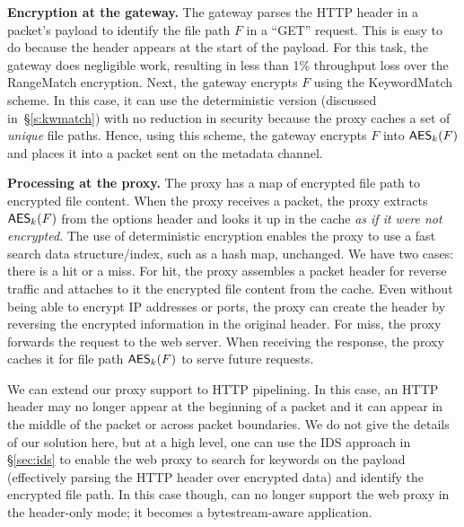 \noindent\textbf{Encryption at the gateway.} 
The gateway parses the HTTP header in a packet's payload to identify the file path $F$ in a ``GET'' request. 
This is easy to do because the header appears at the start of the payload. For this task, the gateway does negligible work, resulting in less than 1\% throughput loss over the RangeMatch encryption. 
Next, the gateway encrypts $F$ using the KeywordMatch scheme. In this case, it can use the deterministic version (discussed in~\S\ref{s:kwmatch}) with no reduction in security because the proxy caches a set of {\em unique} file paths. Hence, using this scheme, the gateway encrypts $F$ into $\mathsf{AES}_k(F)$ and places it into a packet sent on the metadata channel. %

\noindent\textbf{Processing at the proxy.} The proxy has a map of encrypted file path to encrypted file content. When the proxy receives a packet, the proxy extracts $\mathsf{AES}_k(F)$ from the options header and looks it up in the cache {\em as if it were not encrypted}. The use of deterministic encryption enables the proxy to use a fast search data structure/index, such as a hash map, unchanged. We have two cases: there is a hit or a miss. For hit, the proxy assembles a packet header for reverse traffic and attaches to it the encrypted file content from the cache. Even without being able to encrypt IP addresses or ports, the proxy can create the header by reversing the encrypted information in the original header.
For miss, the proxy forwards the request to the web server. When receiving the response, the proxy caches it for file path $\mathsf{AES}_k(F)$ to serve future requests.

We can extend our proxy support to HTTP pipelining. %
In this case,  an HTTP header may no longer appear at the beginning of a packet and it can appear in the middle of the packet or across packet boundaries. We do not give the details of our solution here, but at a high level, one can use the IDS approach in \S\ref{sec:ids} to enable the web proxy to search for keywords on the payload  (effectively parsing the HTTP header over encrypted data) and identify the encrypted file path. In this case though, \sys can no longer support the web proxy in the header-only mode; it becomes a bytestream-aware application. 


